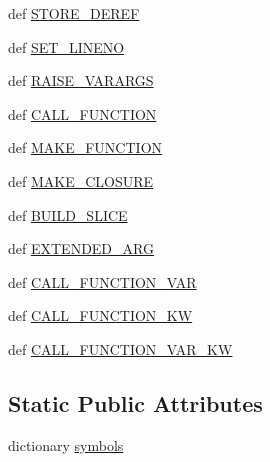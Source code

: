 \begin{DoxyCompactItemize}
\item 
def \hyperlink{classscipy_1_1weave_1_1bytecodecompiler_1_1ByteCodeMeaning_a59dce121f79badb2f55ec6d26aed12bd}{S\+T\+O\+R\+E\+\_\+\+D\+E\+R\+E\+F}
\item 
def \hyperlink{classscipy_1_1weave_1_1bytecodecompiler_1_1ByteCodeMeaning_a72a5293dcba23eb6e77750baf3ab6d72}{S\+E\+T\+\_\+\+L\+I\+N\+E\+N\+O}
\item 
def \hyperlink{classscipy_1_1weave_1_1bytecodecompiler_1_1ByteCodeMeaning_a0ede1a67b4357ce4b16a71dd09aef14b}{R\+A\+I\+S\+E\+\_\+\+V\+A\+R\+A\+R\+G\+S}
\item 
def \hyperlink{classscipy_1_1weave_1_1bytecodecompiler_1_1ByteCodeMeaning_ad78d5d8853274f4bb830722ea1b98093}{C\+A\+L\+L\+\_\+\+F\+U\+N\+C\+T\+I\+O\+N}
\item 
def \hyperlink{classscipy_1_1weave_1_1bytecodecompiler_1_1ByteCodeMeaning_aecacdd9244fa0378120e7019d0c368ae}{M\+A\+K\+E\+\_\+\+F\+U\+N\+C\+T\+I\+O\+N}
\item 
def \hyperlink{classscipy_1_1weave_1_1bytecodecompiler_1_1ByteCodeMeaning_a8052365756224443bf90a9a77538d33d}{M\+A\+K\+E\+\_\+\+C\+L\+O\+S\+U\+R\+E}
\item 
def \hyperlink{classscipy_1_1weave_1_1bytecodecompiler_1_1ByteCodeMeaning_a9c3982408ee635a27e2adaa2bac2052c}{B\+U\+I\+L\+D\+\_\+\+S\+L\+I\+C\+E}
\item 
def \hyperlink{classscipy_1_1weave_1_1bytecodecompiler_1_1ByteCodeMeaning_af4a73423dfcc7a4eed1a41c3385b33be}{E\+X\+T\+E\+N\+D\+E\+D\+\_\+\+A\+R\+G}
\item 
def \hyperlink{classscipy_1_1weave_1_1bytecodecompiler_1_1ByteCodeMeaning_a594e951f68cd8a357ac669387b942b37}{C\+A\+L\+L\+\_\+\+F\+U\+N\+C\+T\+I\+O\+N\+\_\+\+V\+A\+R}
\item 
def \hyperlink{classscipy_1_1weave_1_1bytecodecompiler_1_1ByteCodeMeaning_aaa33792bd5f7060599608f70a0e86a23}{C\+A\+L\+L\+\_\+\+F\+U\+N\+C\+T\+I\+O\+N\+\_\+\+K\+W}
\item 
def \hyperlink{classscipy_1_1weave_1_1bytecodecompiler_1_1ByteCodeMeaning_a02b91fedcb0e8e4a9bd8967b16a88cb5}{C\+A\+L\+L\+\_\+\+F\+U\+N\+C\+T\+I\+O\+N\+\_\+\+V\+A\+R\+\_\+\+K\+W}
\end{DoxyCompactItemize}
\subsection*{Static Public Attributes}
\begin{DoxyCompactItemize}
\item 
dictionary \hyperlink{classscipy_1_1weave_1_1bytecodecompiler_1_1ByteCodeMeaning_a87cd48ab6f941c028ddca2bb15820ba3}{symbols}
\end{DoxyCompactItemize}


